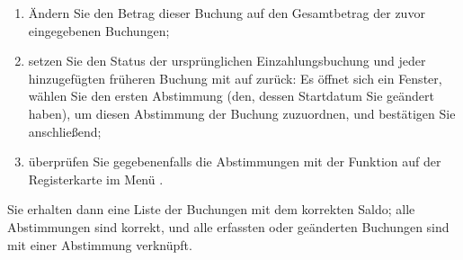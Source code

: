 \begin{enumerate}
	\item Ändern Sie den Betrag dieser Buchung auf den Gesamtbetrag der zuvor eingegebenen Buchungen;
	\item setzen Sie den Status der ursprünglichen Einzahlungsbuchung und jeder hinzugefügten früheren Buchung mit  auf  zurück: Es öffnet sich ein Fenster, wählen Sie den ersten Abstimmung (den, dessen Startdatum Sie geändert haben), um diesen Abstimmung der Buchung zuzuordnen, und bestätigen Sie anschließend;
	\item überprüfen Sie gegebenenfalls die Abstimmungen mit der Funktion  auf der Registerkarte  im Menü .
\end{enumerate}

Sie erhalten dann eine Liste der Buchungen mit dem korrekten Saldo; alle Abstimmungen sind korrekt, und alle erfassten oder geänderten Buchungen sind mit einer Abstimmung verknüpft.
